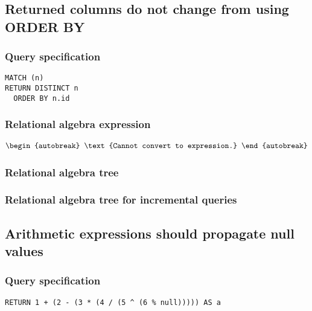 \subsection{Returned columns do not change from using ORDER BY}

\subsubsection*{Query specification}

\begin{lstlisting}
MATCH (n)
RETURN DISTINCT n
  ORDER BY n.id
\end{lstlisting}

\subsubsection*{Relational algebra expression}

\begin{align*}
\begin{autobreak}
\text{Cannot convert to expression.}
\end{autobreak}
\end{align*}

\subsubsection*{Relational algebra tree}


\subsubsection*{Relational algebra tree for incremental queries}


\subsection{Arithmetic expressions should propagate null values}

\subsubsection*{Query specification}

\begin{lstlisting}
RETURN 1 + (2 - (3 * (4 / (5 ^ (6 % null))))) AS a
\end{lstlisting}

